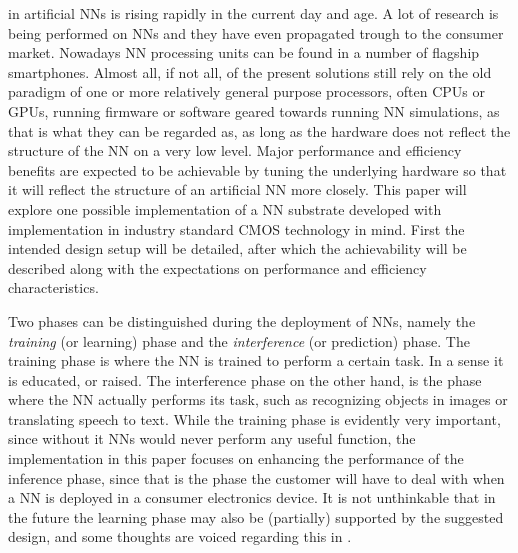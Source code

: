 
 in artificial \acp{NN} is rising rapidly in the current day and age. A lot of research is being performed on \acp{NN} and they have even propagated trough to the consumer market. Nowadays \ac{NN} processing units can be found in a number of flagship smartphones. Almost all, if not all, of the present solutions still rely on the old paradigm of one or more relatively general purpose processors, often \acp{CPU} or \acp{GPU}, running firmware or software geared towards running \ac{NN} simulations, as that is what they can be regarded as, as long as the hardware does not reflect the structure of the \ac{NN} on a very low level. Major performance and efficiency benefits are expected to be achievable by tuning the underlying hardware so that it will reflect the structure of an artificial \ac{NN} more closely. This paper will explore one possible implementation of a \ac{NN} substrate developed with implementation in industry standard CMOS technology in mind. First the intended design setup will be detailed, after which the achievability will be described along with the expectations on performance and efficiency characteristics.

Two phases can be distinguished during the deployment of \acp{NN}, namely the \textit{training} (or learning) phase and the \textit{interference} (or prediction) phase\cite{8192463}. The training phase is where the \ac{NN} is trained to perform a certain task. In a sense it is educated, or raised. The interference phase on the other hand, is the phase where the \ac{NN} actually performs its task, such as recognizing objects in images or translating speech to text. While the training phase is evidently very important, since without it \acp{NN} would never perform any useful function, the implementation in this paper focuses on enhancing the performance of the inference phase, since that is the phase the customer will have to deal with when a \ac{NN} is deployed in a consumer electronics device. It is not unthinkable that in the future the learning phase may also be (partially) supported by the suggested design, and some thoughts are voiced regarding this in .

